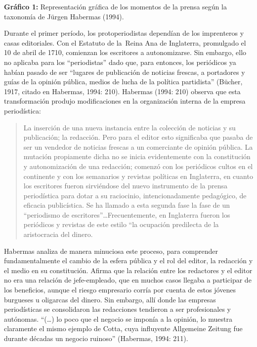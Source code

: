 \textbf{Gráfico 1:} Representación gráfica de los momentos de la prensa según la taxonomía de Jürgen Habermas (1994).


Durante el primer período, los protoperiodistas dependían de los imprenteros y casas editoriales. Con el Estatuto de la~Reina Ana de Inglaterra, promulgado el 10 de abril de 1710, comienzan los escritores a autonomizarse. Sin embargo, ello no aplicaba para los \enquote{periodistas} dado que, para entonces, los periódicos ya habían pasado de ser \enquote{lugares de publicación de noticias frescas, a portadores y guías de la opinión pública, medios de lucha de la política partidista} (Bücher, 1917, citado en Habermas, 1994: 210). Habermas (1994: 210) observa que esta transformación produjo modificaciones en la organización interna de la empresa periodística:

\begin{quote}
	La inserción de una nueva instancia entre la colección de noticias y su publicación; la redacción. Pero para el editor esto significaba que pasaba de ser un vendedor de noticias frescas a un comerciante de opinión pública. La mutación propiamente dicha no se inicia evidentemente con la constitución y autonomización de una redacción; comenzó con los periódicos cultos en el continente y con los semanarios y revistas políticas en Inglaterra, en cuanto los escritores fueron sirviéndose del nuevo instrumento de la prensa periodística para dotar a su raciocinio, intencionadamente pedagógico, de eficacia publicística. Se ha llamado a esta segunda fase la fase de un ``periodismo de escritores''\dots Frecuentemente, en Inglaterra fueron los periódicos y revistas de este estilo ``la ocupación predilecta de la aristocracia del dinero.
\end{quote}


Habermas analiza de manera minuciosa este proceso, para comprender fundamentalmente el cambio de la esfera pública y el rol del editor, la redacción y el medio en su constitución. Afirma que la relación entre los redactores y el editor no era una relación de jefe-empleado, que en muchos casos llegaba a participar de los beneficios, aunque el riesgo empresario corría por cuenta de estos jóvenes burgueses u oligarcas del dinero. Sin embargo, allí donde las empresas periodísticas se consolidaron las redacciones tendieron a ser profesionales y autónomas. ``(\dots) lo poco que el negocio se imponía a la opinión, lo muestra claramente el mismo ejemplo de Cotta, cuya influyente Allgemeine Zeitung fue durante décadas un negocio ruinoso'' (Habermas, 1994: 211).

